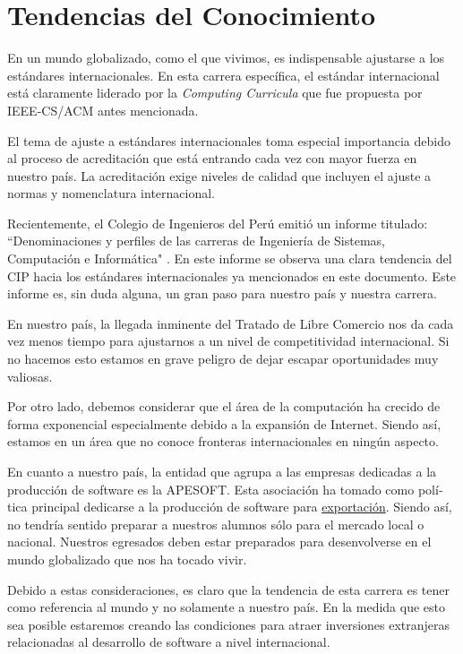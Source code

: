 \section{Tendencias del Conocimiento}\label{sec:cs-tendencias-del-conocimiento}
En un mundo globalizado, como el que vivimos, es indispensable ajustarse a los estándares internacionales. En esta carrera especí­fica, el estándar internacional está claramente liderado por la \textit{Computing Curricula} que fue propuesta por IEEE-CS/ACM antes mencionada.

El tema de ajuste a estándares internacionales toma especial importancia debido al proceso de acreditación que está entrando cada vez con mayor fuerza en nuestro paí­s. La acreditación exige niveles de calidad que incluyen el ajuste a normas y nomenclatura internacional.

Recientemente, el Colegio de Ingenieros del Perú emitió un informe titulado: ``Denominaciones y perfiles de las carreras de Ingenierí­a de Sistemas, Computación e Informática" \cite{CIPInforme2006}. En este informe se observa una clara tendencia del CIP hacia los estándares internacionales ya mencionados en este documento. Este informe es, sin duda alguna, un gran paso para nuestro paí­s y nuestra carrera.

En nuestro paí­s, la llegada inminente del Tratado de Libre Comercio nos da cada vez menos tiempo para ajustarnos a un nivel de competitividad internacional. Si no hacemos esto estamos en grave peligro de dejar escapar oportunidades muy valiosas. 

Por otro lado, debemos considerar que el área de la computación ha crecido de forma exponencial especialmente debido a la expansión de Internet. Siendo así­, estamos en un área que no conoce fronteras internacionales en ningún aspecto.

En cuanto a nuestro paí­s, la entidad que agrupa a las empresas dedicadas a la producción de software es la \ac{APESOFT}. Esta asociación ha tomado como polí­tica principal dedicarse a la producción de software para \underline{exportación}. Siendo así­, no tendrí­a sentido preparar a nuestros alumnos sólo para el mercado local o nacional. Nuestros egresados deben estar preparados para desenvolverse en el mundo globalizado que nos ha tocado vivir.

Debido a estas consideraciones, es claro que la tendencia de esta carrera es tener como referencia al mundo y no solamente a nuestro paí­s. En la medida que esto sea posible estaremos creando las condiciones para atraer inversiones extranjeras relacionadas al desarrollo de software a nivel internacional.
